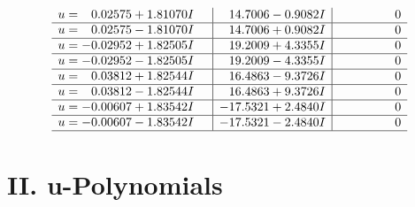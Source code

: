 \documentclass[1p]{elsarticle_modified}
\theoremstyle{definition}
\begin{document}
$$\begin{array}{c|c|c}
\begin{aligned}
u &= \phantom{-}0.02575 + 1.81070 I\end{aligned}
 & \phantom{-}14.7006 - 0.9082 I & \phantom{-0.000000 } 0 \\ \hline\begin{aligned}
u &= \phantom{-}0.02575 - 1.81070 I\end{aligned}
 & \phantom{-}14.7006 + 0.9082 I & \phantom{-0.000000 } 0 \\ \hline\begin{aligned}
u &= -0.02952 + 1.82505 I\end{aligned}
 & \phantom{-}19.2009 + 4.3355 I & \phantom{-0.000000 } 0 \\ \hline\begin{aligned}
u &= -0.02952 - 1.82505 I\end{aligned}
 & \phantom{-}19.2009 - 4.3355 I & \phantom{-0.000000 } 0 \\ \hline\begin{aligned}
u &= \phantom{-}0.03812 + 1.82544 I\end{aligned}
 & \phantom{-}16.4863 - 9.3726 I & \phantom{-0.000000 } 0 \\ \hline\begin{aligned}
u &= \phantom{-}0.03812 - 1.82544 I\end{aligned}
 & \phantom{-}16.4863 + 9.3726 I & \phantom{-0.000000 } 0 \\ \hline\begin{aligned}
u &= -0.00607 + 1.83542 I\end{aligned}
 & -17.5321 + 2.4840 I & \phantom{-0.000000 } 0 \\ \hline\begin{aligned}
u &= -0.00607 - 1.83542 I\end{aligned}
 & -17.5321 - 2.4840 I & \phantom{-0.000000 } 0\\
 \hline 
 \end{array}$$\newpage
\newpage\renewcommand{\arraystretch}{1}
\centering \section*{ II. u-Polynomials}
\end{document}
